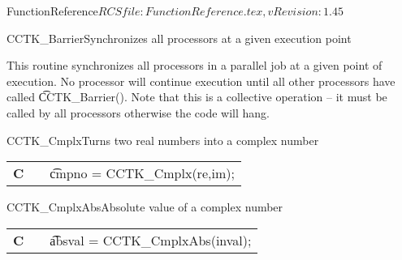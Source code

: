 \begin{cactuspart}{5}{FunctionReference}{$RCSfile: FunctionReference.tex,v $}{$Revision: 1.45 $}


\begin{CCTKFunc}{CCTK\_Barrier}{Synchronizes all processors at a given execution point}
\label{CCTK-Barrier}
\showargs
\begin{params}
\end{params}
\begin{discussion}
\end{discussion}
This routine synchronizes all processors in a parallel job at a given point of
execution. No processor will continue execution until all other processors
have called {\t CCTK\_Barrier()}. Note that this is a collective operation --
it must be called by all processors otherwise the code will hang.
\end{CCTKFunc}




\begin{CCTKFunc}{CCTK\_Cmplx}{Turns two real numbers into a complex number}
\label{CCTK-Cmplx}
\showcargs
\begin{params}
\end{params}
\begin{discussion}
\end{discussion}
\begin{examples}
\begin{tabular}{@{}p{3cm}cp{11cm}}
\hfill {\bf C} && {\t cmpno = CCTK\_Cmplx(re,im)};
\end{tabular}
\end{examples}
\begin{errorcodes}
\end{errorcodes}
\end{CCTKFunc}


\begin{CCTKFunc}{CCTK\_CmplxAbs}{Absolute value of a complex number}
\label{CCTK-CmplxAbs}
\showcargs
\begin{params}
\end{params}
\begin{discussion}
\end{discussion}
\begin{examples}
\begin{tabular}{@{}p{3cm}cp{11cm}}
\hfill {\bf C} && {\t absval = CCTK\_CmplxAbs(inval)};
\end{tabular}
\end{examples}
\begin{errorcodes}
\end{errorcodes}
\end{CCTKFunc}



\end{cactuspart}
